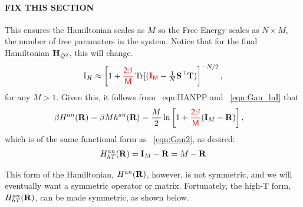 \paragraph{FIX THIS SECTION}
This ensures the Hamiltonian scales as $M$ so the Free Energy scales as $N \times M$, the
number of free paramaters in the system.
Notice that for the final \LayerQualitySquared Hamiltonian $\mathbf{H}_{\bar{\mathcal{Q}}^{2}}$, this will change.
\begin{align}
  \label{eqn:I_9}
    \mathbb{I}_{H}\approx  \left[1  + {\color{red}\sf{\frac{2\beta}{M}}}\operatorname{Tr}[({\color{red}\sf{\mathbf{I}_{M}}}-\tfrac{1}{N}{\mathbf{S}}^{\top}{\mathbf{T}})\right]^{-N/2} ,
\end{align}
for any $M>1$.
Given this, it follows from \EQN~{eqn:HANPP} and \EQN~\ref{eqn:Gan_lnI} that
\begin{align}
\label{eqn:GANmat}
\beta H^{an}(\mathbf{R}) = \beta M h^{an}(\mathbf{R})
  &=  \frac{M}{2}\ln \left[1 + {\color{red}\sf{\frac{2\beta}{M}}}(\mathbf{I}_{M}-\mathbf{R})\right]  ,
\end{align}
which is of the same functional form as \EQN~\ref{eqn:Gan2}, as desired:
\begin{align}
\label{eqn:GANHTmatR}
H^{an}_{hT}(\mathbf{R}) = \mathbf{I}_{M}-\mathbf{R} = M-\mathbf{R}
\end{align}




This form of the Hamiltonian, $H^{an}(\mathbf{R})$, however, is not symmetric, and we will
eventually want a symmetric operator or matrix.
Fortunately, the high-T form, $H^{an}_{hT}(\mathbf{R})$, can be made symmetric, as
shown below.
